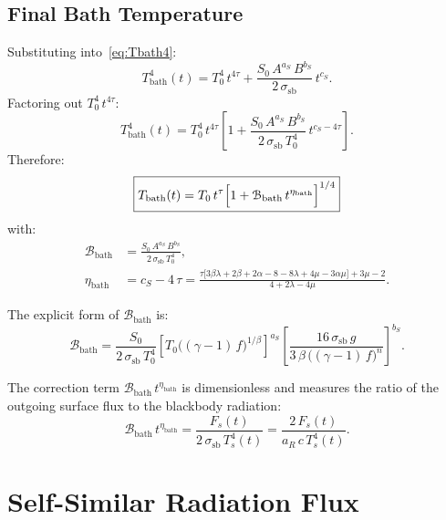 \documentclass[11pt]{article}
\begin{document}
\subsection{Final Bath Temperature}

Substituting into~\eqref{eq:Tbath4}:
\begin{equation}
  T_{\mathrm{bath}}^4(t) = T_0^4\,t^{4\tau}
    + \frac{S_0\,A^{a_S}\,B^{b_S}}{2\,\sigma_{\mathrm{sb}}}\,t^{c_S}.
\end{equation}
Factoring out $T_0^4\,t^{4\tau}$:
\begin{equation}
  T_{\mathrm{bath}}^4(t) = T_0^4\,t^{4\tau}
    \left[1 + \frac{S_0\,A^{a_S}\,B^{b_S}}{2\,\sigma_{\mathrm{sb}}\,T_0^4}\,
    t^{c_S - 4\tau}\right].
\end{equation}
Therefore:
\begin{equation}
  \boxed{
  T_{\mathrm{bath}}(t) = T_0\,t^{\tau}
    \Bigl[1 + \mathcal{B}_{\mathrm{bath}}\,t^{\eta_{\mathrm{bath}}}\Bigr]^{1/4}}
  \label{eq:Tbath_final}
\end{equation}
with:
\begin{align}
  \mathcal{B}_{\mathrm{bath}} &= \frac{S_0\,A^{a_S}\,B^{b_S}}
       {2\,\sigma_{\mathrm{sb}}\,T_0^4}, \\[6pt]
  \eta_{\mathrm{bath}} &= c_S - 4\,\tau
  = \frac{\tau\bigl[3\beta\lambda + 2\beta + 2\alpha - 8 - 8\lambda
          + 4\mu - 3\alpha\mu\bigr] + 3\mu - 2}
         {4 + 2\lambda - 4\mu}.
  \label{eq:eta_bath}
\end{align}

The explicit form of $\mathcal{B}_{\mathrm{bath}}$ is:
\begin{equation}
  \mathcal{B}_{\mathrm{bath}} = \frac{S_0}{2\,\sigma_{\mathrm{sb}}\,T_0^4}
  \left[T_0\bigl((\gamma{-}1)\,f\bigr)^{1/\beta}\right]^{a_S}
  \left[\frac{16\,\sigma_{\mathrm{sb}}\,g}
       {3\,\beta\,\bigl((\gamma{-}1)\,f\bigr)^{n}}\right]^{b_S}.
\end{equation}

The correction term $\mathcal{B}_{\mathrm{bath}}\,t^{\eta_{\mathrm{bath}}}$ is dimensionless and measures the ratio of the outgoing surface flux to the blackbody radiation:
\begin{equation}
  \mathcal{B}_{\mathrm{bath}}\,t^{\eta_{\mathrm{bath}}}
  = \frac{F_s(t)}{2\,\sigma_{\mathrm{sb}}\,T_s^4(t)}
  = \frac{2\,F_s(t)}{a_R\,c\,T_s^4(t)}.
\end{equation}

\section{Self-Similar Radiation Flux}
\label{sec:flux}
\end{document}
